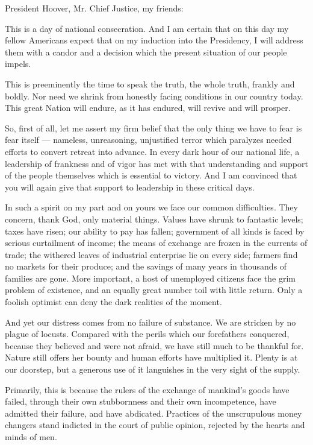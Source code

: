 \documentclass[a4paper]{amsbook}
\begin{document}
\vspace{10 mm}

President Hoover, Mr. Chief Justice, my friends:

This is a day of national consecration. And I am certain that on this day my fellow Americans expect that on my induction into the Presidency, I will address them with a candor and a decision which the present situation of our people impels.

This is preeminently the time to speak the truth, the whole truth, frankly and boldly. Nor need we shrink from honestly facing conditions in our country today. This great Nation will endure, as it has endured, will revive and will prosper.

So, first of all, let me assert my firm belief that the only thing we have to fear is fear itself — nameless, unreasoning, unjustified terror which paralyzes needed efforts to convert retreat into advance. In every dark hour of our national life, a leadership of frankness and of vigor has met with that understanding and support of the people themselves which is essential to victory. And I am convinced that you will again give that support to leadership in these critical days.

In such a spirit on my part and on yours we face our common difficulties. They concern, thank God, only material things. Values have shrunk to fantastic levels; taxes have risen; our ability to pay has fallen; government of all kinds is faced by serious curtailment of income; the means of exchange are frozen in the currents of trade; the withered leaves of industrial enterprise lie on every side; farmers find no markets for their produce; and the savings of many years in thousands of families are gone. More important, a host of unemployed citizens face the grim problem of existence, and an equally great number toil with little return. Only a foolish optimist can deny the dark realities of the moment.

And yet our distress comes from no failure of substance. We are stricken by no plague of locusts. Compared with the perils which our forefathers conquered, because they believed and were not afraid, we have still much to be thankful for. Nature still offers her bounty and human efforts have multiplied it. Plenty is at our doorstep, but a generous use of it languishes in the very sight of the supply.

Primarily, this is because the rulers of the exchange of mankind's goods have failed, through their own stubbornness and their own incompetence, have admitted their failure, and have abdicated. Practices of the unscrupulous money changers stand indicted in the court of public opinion, rejected by the hearts and minds of men.
\end{document}
